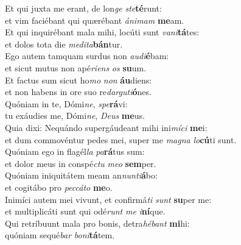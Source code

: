 \evenverse Et qui juxta me erant, de lon\textit{ge} \textit{ste}\textbf{té}runt:~\*\\
\evenverse et vim faciébant qui quærébant \textit{á}\textit{ni}\textit{mam} \textbf{me}am.\\
\oddverse Et qui inquirébant mala mihi, locúti sunt \textit{va}\textit{ni}\textbf{tá}tes:~\*\\
\oddverse et dolos tota die \textit{me}\textit{di}\textit{ta}\textbf{bán}tur.\\
\evenverse Ego autem tamquam surdus non \textit{au}\textit{di}\textbf{é}bam:~\*\\
\evenverse et sicut mutus non apé\textit{ri}\textit{ens} \textit{os} \textbf{su}um.\\
\oddverse Et factus sum sicut ho\textit{mo} \textit{non} \textbf{áu}diens:~\*\\
\oddverse et non habens in ore suo re\textit{dar}\textit{gu}\textit{ti}\textbf{ó}nes.\\
\evenverse Quóniam in te, Dómi\textit{ne}, \textit{spe}\textbf{rá}vi:~\*\\
\evenverse tu exáudies me, Dómi\textit{ne}, \textit{De}\textit{us} \textbf{me}us.\\
\oddverse Quia dixi: Nequándo supergáudeant mihi ini\textit{mí}\textit{ci} \textbf{me}i:~\*\\
\oddverse et dum commovéntur pedes mei, super me \textit{ma}\textit{gna} \textit{lo}\textbf{cú}ti sunt.\\
\evenverse Quóniam ego in flagél\textit{la} \textit{pa}\textbf{rá}tus sum:~\*\\
\evenverse et dolor meus in conspé\textit{ctu} \textit{me}\textit{o} \textbf{sem}per.\\
\oddverse Quóniam iniquitátem meam an\textit{nun}\textit{ti}\textbf{á}bo:~\*\\
\oddverse et cogitábo pro \textit{pec}\textit{cá}\textit{to} \textbf{me}o.\\
\evenverse Inimíci autem mei vivunt, et confirmá\textit{ti} \textit{sunt} \textbf{su}per me:~\*\\
\evenverse et multiplicáti sunt qui odé\textit{runt} \textit{me} \textit{i}\textbf{ní}que.\\
\oddverse Qui retríbuunt mala pro bonis, detra\textit{hé}\textit{bant} \textbf{mi}hi:~\*\\
\oddverse quóniam sequé\textit{bar} \textit{bo}\textit{ni}\textbf{tá}tem.\\

